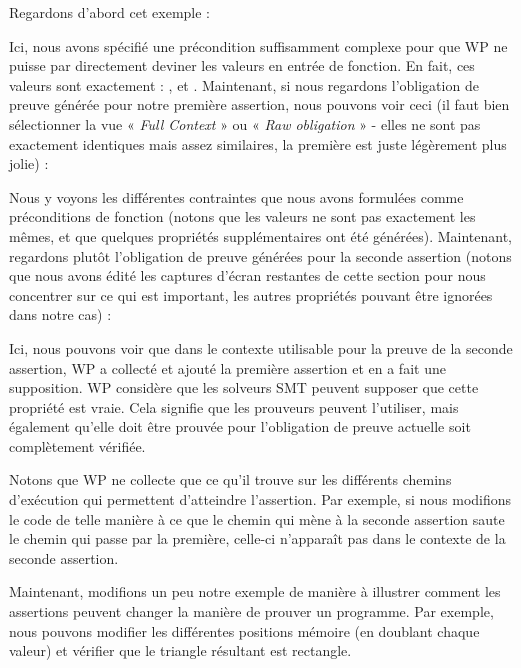 


Regardons d'abord cet exemple :





Ici, nous avons spécifié une précondition suffisamment complexe pour que WP ne
puisse par directement deviner les valeurs en entrée de fonction. En fait, ces
valeurs sont exactement : ,  et
. Maintenant, si nous regardons l'obligation de preuve générée
pour notre première assertion, nous pouvons voir ceci (il faut bien sélectionner
la vue « \textit{Full Context} » ou « \textit{Raw obligation} » - elles ne sont pas exactement
identiques mais assez similaires, la première est juste légèrement plus jolie) :




Nous y voyons les différentes contraintes que nous avons formulées comme préconditions
de fonction (notons que les valeurs ne sont pas exactement les mêmes, et que quelques
propriétés supplémentaires ont été générées). Maintenant, regardons plutôt
l'obligation de preuve générées pour la seconde assertion (notons que nous avons
édité les captures d'écran restantes de cette section pour nous concentrer sur ce
qui est important, les autres propriétés pouvant être ignorées dans notre cas) :




Ici, nous pouvons voir que dans le contexte utilisable pour la preuve de la seconde
assertion, WP a collecté et ajouté la première assertion et en a fait une supposition.
WP considère que les solveurs SMT peuvent supposer que cette propriété est vraie.
Cela signifie que les prouveurs peuvent l'utiliser, mais également qu'elle doit être
prouvée pour l'obligation de preuve actuelle soit complètement vérifiée.


Notons que WP ne collecte que ce qu'il trouve sur les différents chemins d'exécution
qui permettent d'atteindre l'assertion. Par exemple, si nous modifions le code de
telle manière à ce que le chemin qui mène à la seconde assertion saute le chemin qui
passe par la première, celle-ci n'apparaît pas dans le contexte de la seconde assertion.






Maintenant, modifions un peu notre exemple de manière à illustrer comment les
assertions peuvent changer la manière de prouver un programme. Par exemple, nous
pouvons modifier les différentes positions mémoire (en doublant chaque valeur) et
vérifier que le triangle résultant est rectangle.


